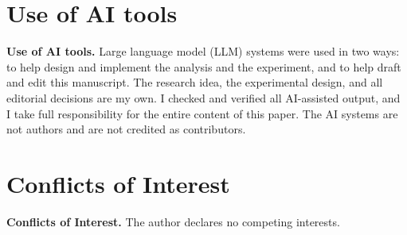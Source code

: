 \documentclass[10pt]{article}
\begin{document}
\section*{Use of AI tools}

\textbf{Use of AI tools.} Large language model (LLM) systems were used in two ways: to help design and implement the analysis and the experiment, and to help draft and edit this manuscript. The research idea, the experimental design, and all editorial decisions are my own. I checked and verified all AI-assisted output, and I take full responsibility for the entire content of this paper. The AI systems are not authors and are not credited as contributors.

\section*{Conflicts of Interest}

\textbf{Conflicts of Interest.} The author declares no competing interests.
\end{document}
